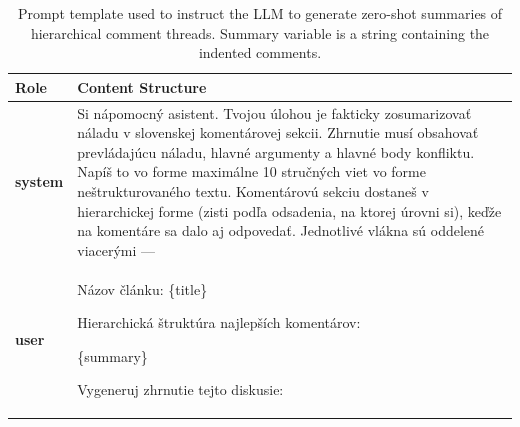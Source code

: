 \documentclass[11pt,a4paper]{article}
\begin{document}
\begin{table}[H]
	\centering
	\small
	\begin{tabular}{@{}lp{12cm}@{}}
		\toprule
		\textbf{Role}   & \textbf{Content Structure}                                                                                                                                                                                                                                                                                                                                                                                                                                          \\ \midrule
		\textbf{system} & Si nápomocný asistent. Tvojou úlohou je fakticky zosumarizovať náladu v slovenskej komentárovej sekcii. Zhrnutie musí obsahovať prevládajúcu náladu, hlavné argumenty a hlavné body konfliktu. Napíš to vo forme maximálne 10 stručných viet vo forme neštrukturovaného textu. Komentárovú sekciu dostaneš v hierarchickej forme (zisti podľa odsadenia, na ktorej úrovni si), keďže na komentáre sa dalo aj odpovedať. Jednotlivé vlákna sú oddelené viacerými --- \\ \midrule
		\textbf{user}   & \raggedright\arraybackslash Názov článku: \{title\} \par\vspace{0.5em} Hierarchická štruktúra najlepších komentárov: \par \{summary\} \par\vspace{0.5em} Vygeneruj zhrnutie tejto diskusie:                                                                                                                                                                                                                                                                         \\ \bottomrule
	\end{tabular}
	\caption{Prompt template used to instruct the LLM to generate zero-shot summaries of hierarchical comment threads. Summary variable is a string containing the indented comments.}
	\label{tab:comment_summarization_prompt}
\end{table}
\end{document}
